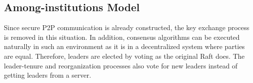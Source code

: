 \subsection{Among-institutions Model}
Since secure P2P communication is already constructed, the key exchange process is removed in this situation. In addition, consensus algorithms can be executed naturally in such an environment as it is in a decentralized system where parties are equal. Therefore, leaders are elected by voting as the original Raft does. The leader-tenure and reorganization processes also vote for new leaders instead of getting leaders from a server.